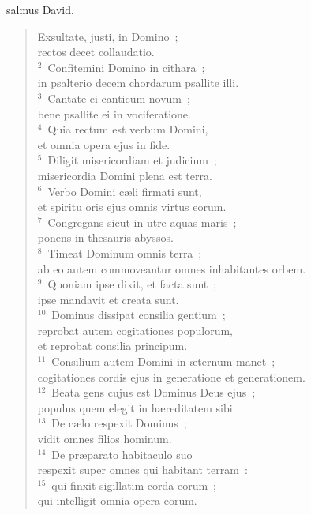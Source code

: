 \bchapter
{}salmus David. \begin{flushleft}\begin{verse}\vspace{6pt}Exsultate, justi, in Domino~;\\ rectos decet collaudatio.\\
${}^{2}$~Confitemini Domino in cithara~;\\ in psalterio decem chordarum psallite illi.\\
${}^{3}$~Cantate ei canticum novum~;\\ bene psallite ei in vociferatione.\\
${}^{4}$~Quia rectum est verbum Domini,\\ et omnia opera ejus in fide.\\
${}^{5}$~Diligit misericordiam et judicium~;\\ misericordia Domini plena est terra.\\
${}^{6}$~Verbo Domini c\ae li firmati sunt,\\ et spiritu oris ejus omnis virtus eorum.\\
${}^{7}$~Congregans sicut in utre aquas maris~;\\ ponens in thesauris abyssos.\\
${}^{8}$~Timeat Dominum omnis terra~;\\ ab eo autem commoveantur omnes inhabitantes orbem.\\
${}^{9}$~Quoniam ipse dixit, et facta sunt~;\\ ipse mandavit et creata sunt.\\
${}^{10}$~Dominus dissipat consilia gentium~;\\ reprobat autem cogitationes populorum,\\ et reprobat consilia principum.\\
${}^{11}$~Consilium autem Domini in \ae ternum manet~;\\ cogitationes cordis ejus in generatione et generationem.\\
${}^{12}$~Beata gens cujus est Dominus Deus ejus~;\\ populus quem elegit in h\ae reditatem sibi.\\
${}^{13}$~De c\ae lo respexit Dominus~;\\ vidit omnes filios hominum.\\
${}^{14}$~De pr\ae parato habitaculo suo\\ respexit super omnes qui habitant terram~:\\
${}^{15}$~qui finxit sigillatim corda eorum~;\\ qui intelligit omnia opera eorum.\\

\end{verse}
\end{flushleft}
